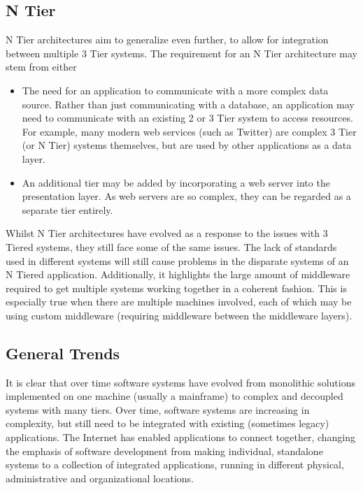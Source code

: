 \documentclass{article}
\begin{document}
\subsection{N Tier}
N Tier architectures aim to generalize even further, to allow for integration between multiple 3 Tier systems. The requirement for an N Tier architecture may stem from either
\begin{itemize}
    \item The need for an application to communicate with a more complex data source. Rather than just communicating with a database, an application may need to communicate with an existing 2 or 3 Tier system to access resources. For example, many modern web services (such as Twitter) are complex 3 Tier (or N Tier) systems themselves, but are used by other applications as a data layer.

    \item An additional tier may be added by incorporating a web server into the presentation layer. As web servers are so complex, they can be regarded as a separate tier entirely.
\end{itemize}

Whilst N Tier architectures have evolved as a response to the issues with 3 Tiered systems, they still face some of the same issues. The lack of standards used in different systems will still cause problems in the disparate systems of an N Tiered application. Additionally, it highlights the large amount of middleware required to get multiple systems working together in a coherent fashion. This is especially true when there are multiple machines involved, each of which may be using custom middleware (requiring middleware between the middleware layers).

\subsection{General Trends}
It is clear that over time software systems have evolved from monolithic solutions implemented on one machine (usually a mainframe) to complex and decoupled systems with many tiers. Over time, software systems are increasing in complexity, but still need to be integrated with existing (sometimes legacy) applications. The Internet has enabled applications to connect together, changing the emphasis of software development from making individual, standalone systems to a collection of integrated applications, running in different physical, administrative and organizational locations. 
\end{document}

